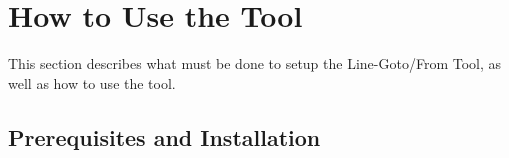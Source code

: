\documentclass{article}
\makeatletter
\newcommand{\ToolName}{Line-Goto/From Tool\@\xspace}
\makeatother
\begin{document}
%
	
\section{How to Use the Tool}
This section describes what must be done to setup the \ToolName, as well as how to use the tool.

\subsection{Prerequisites and Installation}
\end{document}
